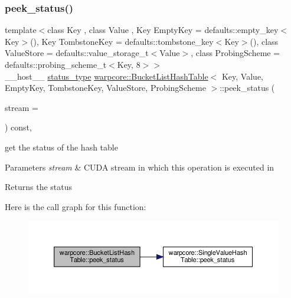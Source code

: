 \subsubsection{\texorpdfstring{peek\+\_\+status()}{peek\_status()}}
{\footnotesize\ttfamily template$<$class Key , class Value , Key Empty\+Key = defaults\+::empty\+\_\+key$<$\+Key$>$(), Key Tombstone\+Key = defaults\+::tombstone\+\_\+key$<$\+Key$>$(), class Value\+Store  = defaults\+::value\+\_\+storage\+\_\+t$<$\+Value$>$, class Probing\+Scheme  = defaults\+::probing\+\_\+scheme\+\_\+t$<$\+Key, 8$>$$>$ \\
\+\_\+\+\_\+host\+\_\+\+\_\+ \hyperlink{classwarpcore_1_1Status}{status\+\_\+type} \hyperlink{classwarpcore_1_1BucketListHashTable}{warpcore\+::\+Bucket\+List\+Hash\+Table}$<$ Key, Value, Empty\+Key, Tombstone\+Key, Value\+Store, Probing\+Scheme $>$\+::peek\+\_\+status (\begin{DoxyParamCaption}\item[{const cuda\+Stream\+\_\+t}]{stream = {} }\end{DoxyParamCaption}) const\hspace{0.3cm}{\ttfamily [inline]}, {\ttfamily [noexcept]}}



get the status of the hash table 


\begin{DoxyParams}{Parameters}
{\em stream} & C\+U\+DA stream in which this operation is executed in \\
\hline
\end{DoxyParams}
\begin{DoxyReturn}{Returns}
the status 
\end{DoxyReturn}
Here is the call graph for this function\+:
\nopagebreak
\begin{figure}[H]
\begin{center}
\leavevmode
\includegraphics[width=350pt]{classwarpcore_1_1BucketListHashTable_a25416b0266a4e91d8d85e1ee6571508c_cgraph}
\end{center}
\end{figure}
\mbox{\label{classwarpcore_1_1BucketListHashTable_a4ffc8f2f167156c082efbd434be1d314}} 
